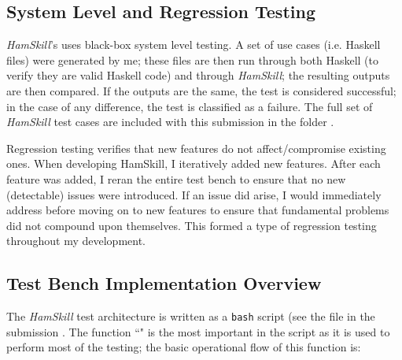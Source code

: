 \documentclass{report}
\begin{document}
\subsection{System Level and Regression Testing}

\textit{HamSkill}'s uses black-box system level testing.  A set of use cases (i.e. Haskell files) were generated by me; these files are then run through both Haskell (to verify they are valid Haskell code) and through \textit{HamSkill}; the resulting outputs are then compared.  If the outputs are the same, the test is considered successful; in the case of any difference, the test is classified as a failure.  The full set of \textit{HamSkill} test cases are included with this submission in the folder .

Regression testing verifies that new features do not affect/compromise existing ones.  When developing HamSkill, I iteratively added new features.  After each feature was added, I reran the entire test bench to ensure that no new (detectable) issues were introduced.  If an issue did arise, I would immediately address before moving on to new features to ensure that fundamental problems did not compound upon themselves. This formed a type of regression testing throughout my development.

\subsection{Test Bench Implementation Overview}

The \textit{HamSkill} test architecture is written as a \texttt{bash} script (see the file in the submission .  The function ``" is the most important in the script as it is used to perform most of the testing; the basic operational flow of this function is:
\end{document}
